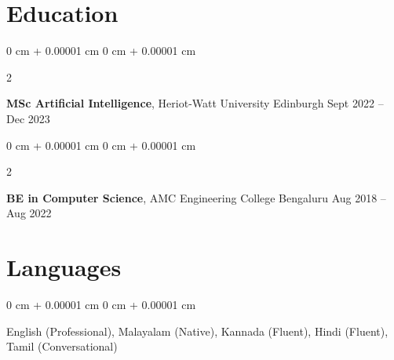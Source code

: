 \documentclass[10pt, letterpaper]{article}
\newenvironment{onecolentry}{
    \begin{adjustwidth}{
        0 cm + 0.00001 cm
    }{
        0 cm + 0.00001 cm
    }
}{
    \end{adjustwidth}
} %
\newenvironment{twocolentry}[2][]{
    \onecolentry
    \def\secondColumn{#2}
    \setcolumnwidth{\fill, 4.5 cm}
    \begin{paracol}{2}
}{
    \switchcolumn \raggedleft \secondColumn
    \end{paracol}
    \endonecolentry
} %
\begin{document}
        \vspace{0.2 cm}

    \section{Education}
        
        \begin{twocolentry}{
            Sept 2022 – Dec 2023
        }
            \textbf{MSc Artificial Intelligence}, Heriot-Watt University Edinburgh\end{twocolentry}

        \vspace{0.10 cm}
        
         \begin{twocolentry}{
            Aug 2018 – Aug 2022
        }
           \textbf{BE in Computer Science}, AMC Engineering College Bengaluru \end{twocolentry}

        \vspace{0.10 cm}

    \section{Languages}
        
        \begin{onecolentry}
            English (Professional), Malayalam (Native), Kannada (Fluent), Hindi (Fluent), Tamil (Conversational)
        \end{onecolentry}

        \vspace{0.2 cm}
\end{document}

